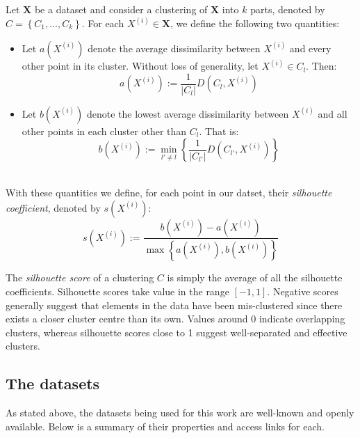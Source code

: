 \begin{definition}\label{def:silhouette}
    Let \textbf{X} be a dataset and consider a clustering of \textbf{X} into
    \(k\) parts, denoted by \(C = \left\{C_1, \ldots, C_k\right\}\). For each
    \(X^{(i)} \in \textbf{X}\), we define the following two quantities:
    \begin{itemize}
        \item Let \(a\left(X^{(i)}\right)\) denote the average dissimilarity
            between \(X^{(i)}\) and every other point in its cluster. Without
            loss of generality, let \(X^{(i)} \in C_l\). Then:
            \[
                a\left(X^{(i)}\right) := \frac{1}{|C_l|} D\left(C_l,
                X^{(i)}\right)
            \]
        \item Let \(b\left(X^{(i)}\right)\) denote the lowest average 
            dissimilarity between \(X^{(i)}\) and all other points in each
            cluster other than \(C_l\). That is:
            \[
                b\left(X^{(i)}\right) := \min_{l' \neq l} \left\{
                \frac{1}{|C_{l'}|} D\left(C_{l'}, X^{(i)}\right) \right\}
            \]\\
    \end{itemize}

    With these quantities we define, for each point in our datset, their
    \emph{silhouette coefficient}, denoted by \(s(X^{(i)})\):
    \[
        s(X^{(i)}) := \frac{b\left(X^{(i)}\right) -
        a\left(X^{(i)}\right)}{\max\left\{a\left(X^{(i)}\right),
        b\left(X^{(i)}\right)\right\}}
    \]

    The \emph{silhouette score} of a clustering \(C\) is simply the average of
all the silhouette coefficients. Silhouette scores take value in the range
\([-1, 1]\). Negative scores generally suggest that elements in the data have
been mis-clustered since there exists a closer cluster centre than its own.
Values around 0 indicate overlapping clusters, whereas silhouette scores close
to 1 suggest well-separated and effective clusters.
\end{definition}


\subsection{The datasets}\label{subsec:datasets}

As stated above, the datasets being used for this work are well-known and openly
available. Below is a summary of their properties and access links for each.

